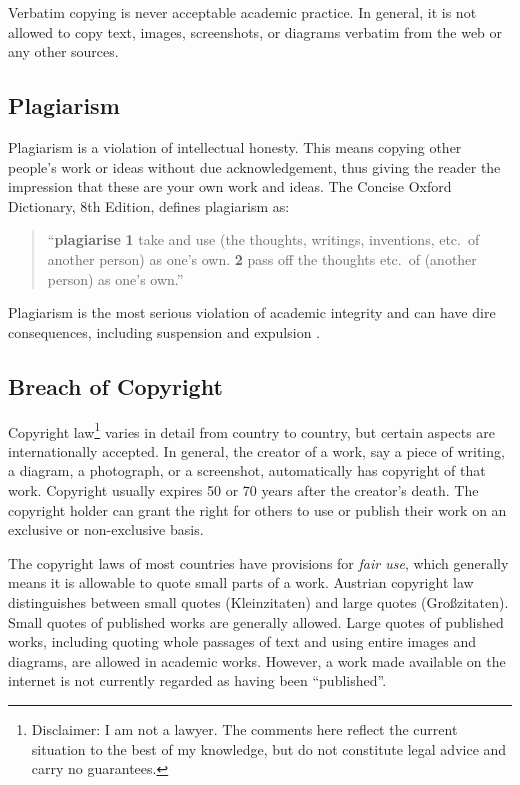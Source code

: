 Verbatim copying is never acceptable academic practice. In general, it
is not allowed to copy text, images, screenshots, or diagrams verbatim
from the web or any other sources.



\subsection{Plagiarism}

Plagiarism is a violation of intellectual honesty. This means copying
other people's work or ideas without due acknowledgement, thus giving
the reader the impression that these are your own work and ideas. The
Concise Oxford Dictionary, 8th Edition, defines plagiarism as:
\begin{quotation}
\noindent
``\textbf{plagiarise}
\textbf{1} take and use (the thoughts, writings, inventions, etc.\ of
another person) as one's own. \textbf{2} pass off the thoughts etc.\
of (another person) as one's own.''
\end{quotation}
Plagiarism is the most serious violation of academic integrity and can
have dire consequences, including suspension and expulsion
\citep{Reisman2005}.



\subsection{Breach of Copyright}

Copyright law\footnote{Disclaimer: I am not a lawyer. The comments
here reflect the current situation to the best of my knowledge,
but do not constitute legal advice and carry no guarantees.}
varies in detail from country to country, but certain
aspects are internationally accepted. In general, the creator of a
work, say a piece of writing, a diagram, a photograph, or a
screenshot, automatically has copyright of that work. Copyright
usually expires 50 or 70 years after the creator's death. The
copyright holder can grant the right for others to use or publish
their work on an exclusive or non-exclusive basis.

The copyright laws of most countries have provisions for \emph{fair
use}, which generally means it is allowable to quote small parts of a
work. Austrian copyright law \citep[§ 46]{UrhG} distinguishes between
small quotes (Kleinzitaten) and large quotes (Großzitaten). Small
quotes of published works are generally allowed. Large quotes of
published works, including quoting whole passages of text and using
entire images and diagrams, are allowed in academic works. However, a
work made available on the internet is not currently regarded as
having been ``published''.

